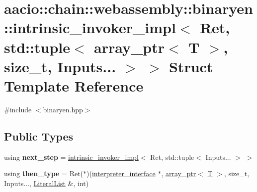 \hypertarget{structaacio_1_1chain_1_1webassembly_1_1binaryen_1_1intrinsic__invoker__impl_3_01_ret_00_01std_1_b3e975430cfc0d3e9c5a425fc85ba2d6}{}\section{aacio\+:\+:chain\+:\+:webassembly\+:\+:binaryen\+:\+:intrinsic\+\_\+invoker\+\_\+impl$<$ Ret, std\+:\+:tuple$<$ array\+\_\+ptr$<$ T $>$, size\+\_\+t, Inputs... $>$ $>$ Struct Template Reference}
\label{structaacio_1_1chain_1_1webassembly_1_1binaryen_1_1intrinsic__invoker__impl_3_01_ret_00_01std_1_b3e975430cfc0d3e9c5a425fc85ba2d6}


{\ttfamily \#include $<$binaryen.\+hpp$>$}

\subsection*{Public Types}
\begin{DoxyCompactItemize}
\item 
\mbox{\label{structaacio_1_1chain_1_1webassembly_1_1binaryen_1_1intrinsic__invoker__impl_3_01_ret_00_01std_1_b3e975430cfc0d3e9c5a425fc85ba2d6_ae26da699f981affd221ed31dd884d7af}} 
using {\bfseries next\+\_\+step} = \mbox{\hyperlink{structaacio_1_1chain_1_1webassembly_1_1binaryen_1_1intrinsic__invoker__impl}{intrinsic\+\_\+invoker\+\_\+impl}}$<$ Ret, std\+::tuple$<$ Inputs... $>$ $>$
\item 
\mbox{\label{structaacio_1_1chain_1_1webassembly_1_1binaryen_1_1intrinsic__invoker__impl_3_01_ret_00_01std_1_b3e975430cfc0d3e9c5a425fc85ba2d6_a5406918b6bb5978b614c13bc52693827}} 
using {\bfseries then\+\_\+type} = Ret($\ast$)(\mbox{\hyperlink{structaacio_1_1chain_1_1webassembly_1_1binaryen_1_1interpreter__interface}{interpreter\+\_\+interface}} $\ast$, \mbox{\hyperlink{structaacio_1_1chain_1_1array__ptr}{array\+\_\+ptr}}$<$ \mbox{\hyperlink{struct_t}{T}} $>$, size\+\_\+t, Inputs..., \mbox{\hyperlink{classstd_1_1vector}{Literal\+List}} \&, int)
\end{DoxyCompactItemize}
